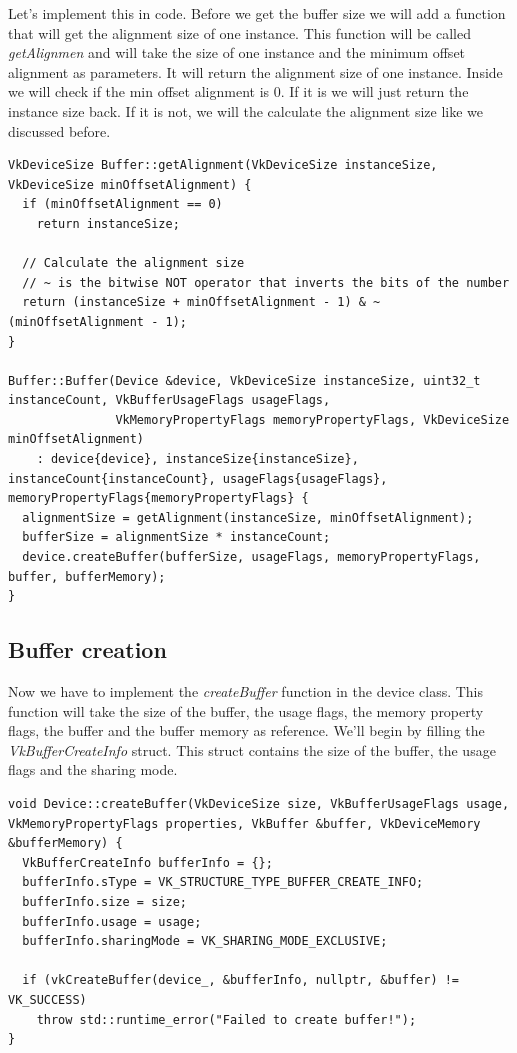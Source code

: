 \documentclass[12pt]{report} \usepackage{preamble}
\begin{document}
Let's implement this in code.
Before we get the buffer size we will add a function that will get the alignment size of one instance. This function will be called \textit{getAlignmen}
and will take the size of one instance and the minimum offset alignment as parameters. It will return the alignment size of one instance.
Inside we will check if the min offset alignment is 0. If it is we will just return the instance size back. If it is not, we will
the calculate the alignment size like we discussed before.

\begin{lstlisting}[Language=C++]
VkDeviceSize Buffer::getAlignment(VkDeviceSize instanceSize, VkDeviceSize minOffsetAlignment) {
  if (minOffsetAlignment == 0)
    return instanceSize;

  // Calculate the alignment size
  // ~ is the bitwise NOT operator that inverts the bits of the number
  return (instanceSize + minOffsetAlignment - 1) & ~(minOffsetAlignment - 1);
}

Buffer::Buffer(Device &device, VkDeviceSize instanceSize, uint32_t instanceCount, VkBufferUsageFlags usageFlags, 
               VkMemoryPropertyFlags memoryPropertyFlags, VkDeviceSize minOffsetAlignment) 
    : device{device}, instanceSize{instanceSize}, instanceCount{instanceCount}, usageFlags{usageFlags}, memoryPropertyFlags{memoryPropertyFlags} {
  alignmentSize = getAlignment(instanceSize, minOffsetAlignment);
  bufferSize = alignmentSize * instanceCount;
  device.createBuffer(bufferSize, usageFlags, memoryPropertyFlags, buffer, bufferMemory);
}
\end{lstlisting}

\subsection{Buffer creation}

Now we have to implement the \textit{createBuffer} function in the device class.
This function will take the size of the buffer, the usage flags, the memory property flags, the buffer and the buffer memory as reference.
We'll begin by filling the \textit{VkBufferCreateInfo} struct. This struct contains the size of the buffer, the usage flags and the sharing mode.

\begin{lstlisting}[Language=C++]
void Device::createBuffer(VkDeviceSize size, VkBufferUsageFlags usage, VkMemoryPropertyFlags properties, VkBuffer &buffer, VkDeviceMemory &bufferMemory) {
  VkBufferCreateInfo bufferInfo = {};
  bufferInfo.sType = VK_STRUCTURE_TYPE_BUFFER_CREATE_INFO;
  bufferInfo.size = size;
  bufferInfo.usage = usage;
  bufferInfo.sharingMode = VK_SHARING_MODE_EXCLUSIVE;

  if (vkCreateBuffer(device_, &bufferInfo, nullptr, &buffer) != VK_SUCCESS)
    throw std::runtime_error("Failed to create buffer!");
}
\end{lstlisting}
\end{document}
